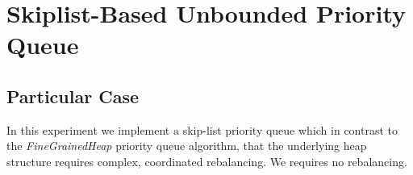 


\section{\textbf{Skiplist-Based Unbounded Priority Queue}}



\subsection{Particular Case}
\par
In this experiment we implement a skip-list priority queue which in contrast to the \textit{FineGrainedHeap} priority queue algorithm, that the underlying heap structure requires complex, coordinated rebalancing. We requires no rebalancing.
\par



